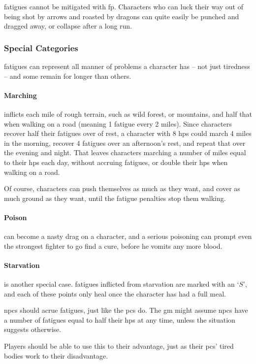\begin{multicols}{2}
\Glspl{fatigue} cannot be mitigated with \gls{fp}. Characters who can luck their way out of being shot by arrows and roasted by dragons can quite easily be punched and dragged away, or collapse after a long run.

\subsubsection{Special Categories}

\Glspl{fatigue} can represent all manner of problems a character has -- not just tiredness -- and some remain for longer than others.

\paragraph{Marching} inflicts  each mile of rough terrain, such as wild forest, or mountains, and half that when walking on a road (meaning 1 \gls{fatigue} every 2 miles).
Since characters recover half their \glspl{fatigue} over  of rest, a character with 8 \glspl{hp} could march 4 miles in the morning, recover 4 \glspl{fatigue} over an afternoon's rest, and repeat that over the evening and night.
That leaves characters marching a number of miles equal to their \glspl{hp} each day, without accruing \glspl{fatigue}, or double their \glspl{hp} when walking on a road.

Of course, characters can push themselves as much as they want, and cover as much ground as they want, until the \gls{fatigue} penalties stop them walking.

\paragraph{Poison} can become a nasty drag on a character, and a serious poisoning can prompt even the strongest fighter to go find a cure, before he vomits any more blood.

\paragraph{Starvation} is another special case.
\glspl{fatigue} inflicted from starvation are marked with an `$S$', and each of these points only heal once the character has had a full meal.


\Glspl{npc} should acrue \glspl{fatigue}, just like the \glspl{pc} do.
The \gls{gm} might assume \glspl{npc} have a number of \glspl{fatigue} equal to half their \glspl{hp} at any time, unless the situation suggests otherwise.

Players should be able to use this to their advantage, just as their \glspl{pc}' tired bodies work to their disadvantage.

\end{multicols}

